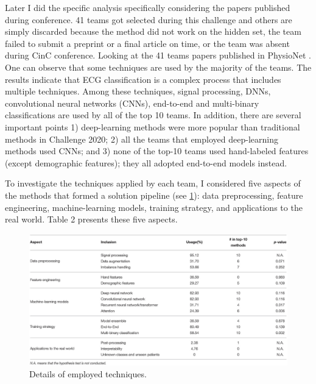 Later I did the specific analysis specifically considering the papers published during conference. 41 teams got selected during this challenge and others are simply discarded because the method did not work on the hidden set, the team failed to submit a preprint or a final article on time, or the team was absent during CinC conference. Looking at the 41 teams papers published in PhysioNet \cite{physionet_challenge_2020}. One can observe that some techniques are used by the majority of the teams. The results indicate that ECG classification is a complex process that includes multiple techniques. Among these techniques, signal processing, DNNs, convolutional neural networks (CNNs), end-to-end and multi-binary classifications are used by all of the top 10 teams. In addition, there are several important points 1) deep-learning methods were more popular than traditional methods in Challenge 2020; 2) all the teams that employed deep-learning methods used CNNs; and 3) none of the top-10 teams used hand-labeled features (except demographic features); they all adopted end-to-end models instead. 

To investigate the techniques applied by each team, I considered five aspects of the methods that formed a solution pipeline (see \ref{fig:meta_analysis_2020_teams}): data preprocessing, feature engineering, machine-learning models, training strategy, and applications to the real world. Table 2 presents these five aspects.


\begin{figure}[H]
\centering
\includegraphics[scale=0.32]{img/meta_analysis_2020_teams.jpeg}
\caption{Details of employed techniques.}
\label{fig:meta_analysis_2020_teams}
\end{figure}


